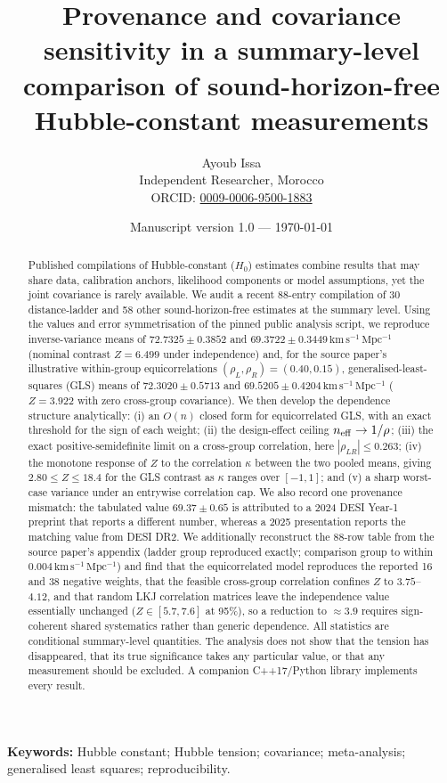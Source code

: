 \documentclass[11pt,a4paper]{article}
\title{Provenance and covariance sensitivity in a summary-level\\ comparison of sound-horizon-free Hubble-constant measurements}
\author{Ayoub Issa\\ \small Independent Researcher, Morocco\\ \small ORCID: \href{https://orcid.org/0009-0006-9500-1883}{0009-0006-9500-1883}}
\date{\small Manuscript version 1.0 --- \today}
\theoremstyle{remark}\newtheorem{remark}{Remark}
\newcommand{\Hz}{H_0}\newcommand{\one}{\bm{1}}
\newcommand{\kmsMpc}{\mathrm{km\,s^{-1}\,Mpc^{-1}}}
\newcommand{\unit}{\,\kmsMpc}
\begin{document}
\maketitle

\begin{abstract}
Published compilations of Hubble-constant ($\Hz$) estimates combine results that may share data, calibration anchors, likelihood components or model assumptions, yet the joint covariance is rarely available. We audit a recent 88-entry compilation of 30 distance-ladder and 58 other sound-horizon-free estimates at the summary level. Using the values and error symmetrisation of the pinned public analysis script, we reproduce inverse-variance means of $72.7325\pm0.3852$ and $69.3722\pm0.3449\unit$ (nominal contrast $Z=6.499$ under independence) and, for the source paper's illustrative within-group equicorrelations $(\rho_L,\rho_R)=(0.40,0.15)$, generalised-least-squares (GLS) means of $72.3020\pm0.5713$ and $69.5205\pm0.4204\unit$ ($Z=3.922$ with zero cross-group covariance). We then develop the dependence structure analytically: (i) an $O(n)$ closed form for equicorrelated GLS, with an exact threshold for the sign of each weight; (ii) the design-effect ceiling $n_{\rm eff}\to1/\rho$; (iii) the exact positive-semidefinite limit on a cross-group correlation, here $|\rho_{LR}|\le0.263$; (iv) the monotone response of $Z$ to the correlation $\kappa$ between the two pooled means, giving $2.80\le Z\le18.4$ for the GLS contrast as $\kappa$ ranges over $[-1,1]$; and (v) a sharp worst-case variance under an entrywise correlation cap. We also record one provenance mismatch: the tabulated value $69.37\pm0.65$ is attributed to a 2024 DESI Year-1 preprint that reports a different number, whereas a 2025 presentation reports the matching value from DESI DR2. We additionally reconstruct the 88-row table from the source paper's appendix (ladder group reproduced exactly; comparison group to within $0.004\unit$) and find that the equicorrelated model reproduces the reported 16 and 38 negative weights, that the feasible cross-group correlation confines $Z$ to $3.75$--$4.12$, and that random LKJ correlation matrices leave the independence value essentially unchanged ($Z\in[5.7,7.6]$ at 95\%), so a reduction to $\approx3.9$ requires sign-coherent shared systematics rather than generic dependence. All statistics are conditional summary-level quantities. The analysis does not show that the tension has disappeared, that its true significance takes any particular value, or that any measurement should be excluded. A companion C++17/Python library implements every result.
\end{abstract}
\noindent\textbf{Keywords:} Hubble constant; Hubble tension; covariance; meta-analysis; generalised least squares; reproducibility.
\end{document}
